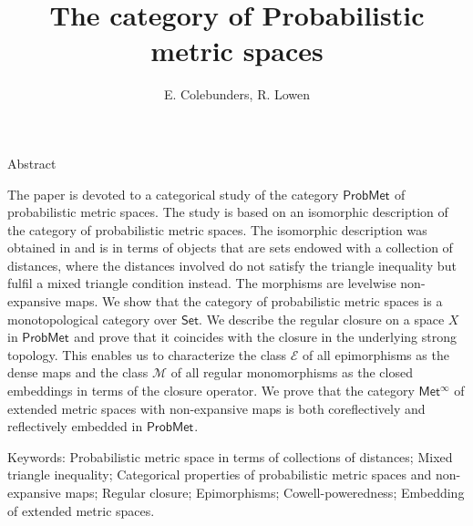 \documentclass[12pt,a4paper]{amsart}
\theoremstyle{theorem}
\theoremstyle{definition}
\newcommand{\PM}{\ensuremath{\mathsf{ProbMet_{}}}}
\begin{document}
\title{The category of Probabilistic metric spaces}
\author{E. Colebunders, R. Lowen}
\date{}
\maketitle



\vspace{.5cm}

\begin{center}
Abstract
\end{center}

\vspace{.1cm}

 \noindent \scriptsize{The paper is devoted to a categorical study of the category $\PM$ of probabilistic metric spaces.
The study is based on an isomorphic description of the category of probabilistic metric spaces. 
 The isomorphic description was obtained in \cite{CL2} and is in terms of objects that are sets endowed with a collection of distances, where
  the distances involved do not satisfy the triangle inequality but fulfil a mixed triangle condition instead. The morphisms are levelwise non-expansive maps.
 We show that the category of probabilistic metric spaces is a monotopological category over $\mathsf{Set}$. We describe the regular closure on a space $X$ in $\PM$ and prove that it coincides with the closure in the underlying strong topology.  This enables us to characterize the class $\mathcal{E}$ of all epimorphisms as the dense maps and the class $\mathcal{M}$ of all regular monomorphisms as the closed embeddings in terms of the closure operator. 
  We prove that the category $\mathsf{Met^{\infty}}$ of extended metric spaces with non-expansive maps is both coreflectively and reflectively embedded in $\PM.$ 

 

   

 
\vspace{.8cm}

 \noindent \footnotesize {Keywords: Probabilistic metric space in terms of collections of distances; Mixed triangle inequality; Categorical properties of probabilistic metric spaces and non-expansive maps; Regular closure; Epimorphisms; Cowell-poweredness; Embedding of extended metric spaces.}\\
 
}
\end{document}
